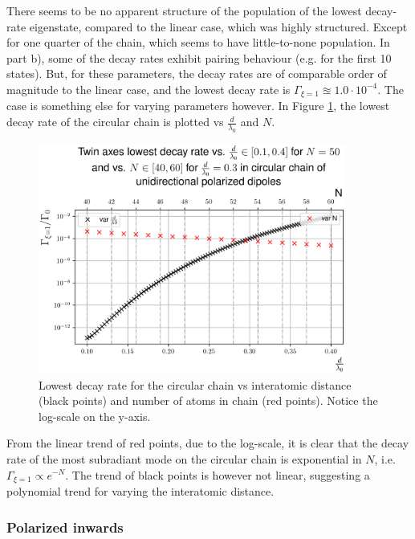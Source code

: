 \documentclass{article}
\begin{document}
There seems to be no apparent structure of the population of the lowest decay-rate eigenstate, compared to the linear case, which was highly structured. Except for one quarter of the chain, which seems to have little-to-none population. In part b), some of the decay rates exhibit pairing behaviour (e.g. for the first 10 states). But, for these parameters, the decay rates are of comparable order of magnitude to the linear case, and the lowest decay rate is $\Gamma_{\xi=1} \approxeq 1.0 \cdot 10^{-4}$. The case is something else for varying parameters however. In Figure \ref{fig:circular_unidirectional_varying}, the lowest decay rate of the circular chain is plotted vs $\frac{d}{\lambda_0}$ and $N$. 

\begin{figure}[H]
    \centering
    \includegraphics[width=0.9\textwidth]{figs/case_circular_unidirectional_var_distance_01_04_var_N_40_60_lowest.png}
    \caption{Lowest decay rate for the circular chain vs interatomic distance (black points) and number of atoms in chain (red points). Notice the log-scale on the y-axis. }
    \label{fig:circular_unidirectional_varying}
\end{figure}

From the linear trend of red points, due to the log-scale, it is clear that the decay rate of the most subradiant mode on the circular chain is exponential in $N$, i.e. $\Gamma_{\xi=1} \propto e^{-N}$. The trend of black points is however not linear, suggesting a polynomial trend for varying the interatomic distance. 

\subsubsection{Polarized inwards}
\end{document}
